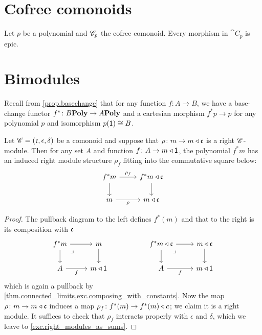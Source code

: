 \documentclass[DynamicalBook]{subfiles}
\begin{document}
\section{Cofree comonoids}

\begin{proposition}
Let $p$ be a polynomial and $\mathscr{C}_{p}$ the cofree comonoid. Every morphism in $\cat{C}_p$ is epic.
\end{proposition}

\section{Bimodules}

Recall from \cref{prop.basechange} that for any function $f\colon A\to B$, we have a base-change functor $f^*\colon B\textbf{Poly}\to A\textbf{Poly}$ and a cartesian morphism $f^*p\to p$ for any polynomial $p$ and isomorphism $p(\textsf{1})\cong B$.

\begin{proposition}\label{prop.right_modules_as_sums}
Let $\mathscr{C}=(\mathfrak{c},\epsilon,\delta)$ be a comonoid and suppose that $\rho\colon m\to m\mathbin{\triangleleft}\mathfrak{c}$ is a right $\mathscr{C}$-module. Then for any set $A$ and function $f\colon A\to m\mathbin{\triangleleft}\textsf{1}$, the polynomial $f^*m$ has an induced right module structure $\rho_f$ fitting into the commutative square below:
\[
\begin{tikzcd}
  f^*m\ar[d]\ar[r, "\rho_f"]&
  f^*m\tri\ema{c}\ar[d]\\
  m\ar[r, "\rho"']&
  m\tri\ema{c}
\end{tikzcd}
\]
\end{proposition}
\begin{proof}
The pullback diagram to the left defines $f^*(m)$ and that to the right is its composition with $\mathfrak{c}$
\[
\begin{tikzcd}
	f^*m\ar[r]\ar[d]&
	m\ar[d]\\
	A\ar[r, "f"']&
	m\tri\1\ar[ul, phantom, very near end, "\lrcorner"]
\end{tikzcd}
\hspace{.7in}
\begin{tikzcd}
	f^*m\tri\ema{c}\ar[r]\ar[d]&
	m\tri\ema{c}\ar[d]\\
	A\ar[r, "f"']&
	m\tri\1\ar[ul, phantom, very near end, "\lrcorner"]
\end{tikzcd}
\]
which is again a pullback by \cref{thm.connected_limits,exc.composing_with_constants}. Now the map $\rho\colon m\to m\mathbin{\triangleleft}\mathfrak{c}$ induces a map $\rho_f\colon f^*(m)\to f^*(m)\mathbin{\triangleleft} c$; we claim it is a right module. It suffices to check that $\rho_f$ interacts properly with $\epsilon$ and $\delta$, which we leave to \cref{exc.right_modules_as_sums}.
\end{proof}
\end{document}
